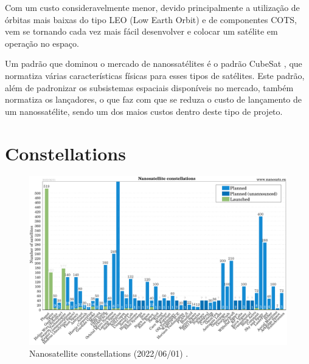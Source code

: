 Com um custo consideravelmente menor, devido principalmente a utilização de órbitas mais baixas do tipo LEO (Low Earth Orbit) e de componentes COTS, vem se tornando cada vez mais fácil desenvolver e colocar um satélite em operação no espaço.

Um padrão que dominou o mercado de nanossatélites é o padrão CubeSat \cite{cds}, que normatiza várias características físicas para esses tipos de satélites. Este padrão, além de padronizar os subsistemas espaciais disponíveis no mercado, também normatiza os lançadores, o que faz com que se reduza o custo de lançamento de um nanossatélite, sendo um dos maios custos dentro deste tipo de projeto.

\section{Constellations}

\begin{figure}[!ht]
    \begin{center}
        \includegraphics[width=\columnwidth]{figures/Nanosats_constellations_2022-06-01}
        \caption{Nanosatellite constellations (2022/06/01) \cite{nanosatseu}.}
        \label{fig:constellations}
    \end{center}
\end{figure}

